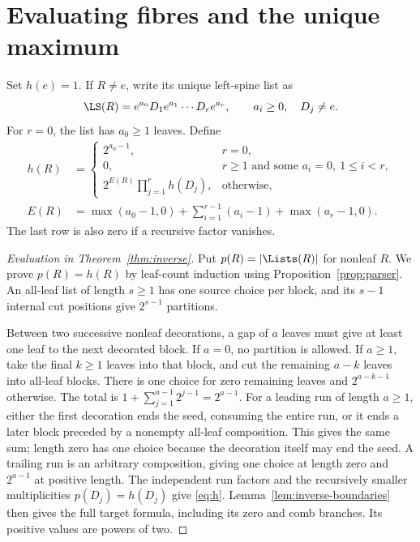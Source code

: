 \section{Evaluating fibres and the unique maximum}\label{sec:extremum}

Set \(h(e)=1\). If \(R\ne e\), write its unique left-spine list as
\[
 \LS(R)=e^{a_0}D_1e^{a_1}\cdots D_re^{a_r},
 \qquad a_i\ge0,\quad D_j\ne e.
\]
For \(r=0\), the list has \(a_0\ge1\) leaves. Define
\begin{equation}\label{eq:h}
 \begin{aligned}
 h(R)&=
 \begin{cases}
 2^{a_0-1},&r=0,\\
 0,&r\ge1\text{ and some }a_i=0,\ 1\le i<r,\\
 2^{E(R)}\displaystyle\prod_{j=1}^r h(D_j),&\text{otherwise},
 \end{cases}\\
 E(R)&=\max(a_0-1,0)+
       \sum_{i=1}^{r-1}(a_i-1)+\max(a_r-1,0).
 \end{aligned}
\end{equation}
The last row is also zero if a recursive factor vanishes.

\begin{proof}[Evaluation in Theorem~\ref{thm:inverse}]
Put \(p(R)=|\Lists(R)|\) for nonleaf \(R\). We prove \(p(R)=h(R)\)
by leaf-count induction using Proposition~\ref{prop:parser}.
An all-leaf list of length \(s\ge1\) has one source choice per block,
and its \(s-1\) internal cut positions give \(2^{s-1}\) partitions.

Between two successive nonleaf decorations, a gap of \(a\) leaves must
give at least one leaf to the next decorated block. If \(a=0\), no
partition is allowed. If \(a\ge1\), take the final \(k\ge1\) leaves into
that block, and cut the remaining \(a-k\) leaves into all-leaf blocks.
There is one choice for zero remaining leaves and \(2^{a-k-1}\) otherwise.
The total is \(1+\sum_{j=1}^{a-1}2^{j-1}=2^{a-1}\).
For a leading run of length \(a\ge1\), either the first decoration ends
the seed, consuming the entire run, or it ends a later block preceded by
a nonempty all-leaf composition. This gives the same sum; length zero
has one choice because the decoration itself may end the seed.
A trailing run is an arbitrary composition, giving one choice at length
zero and \(2^{a-1}\) at positive length. The independent run factors and
the recursively smaller multiplicities \(p(D_j)=h(D_j)\) give
\eqref{eq:h}. Lemma~\ref{lem:inverse-boundaries} then gives the full
target formula, including its zero and comb branches. Its positive
values are powers of two.
\end{proof}

